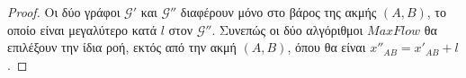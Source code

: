 \begin{proof}
  Οι δύο γράφοι $\mathcal{G}'$ και $\mathcal{G}''$ διαφέρουν μόνο στο βάρος της ακμής $\left(A, B\right)$, το οποίο είναι
  μεγαλύτερο κατά $l$ στον $\mathcal{G}''$. Συνεπώς οι δύο αλγόριθμοι $MaxFlow$ θα επιλέξουν την ίδια ροή, εκτός από την ακμή
  $\left(A, B\right)$, όπου θα είναι $x''_{AB} = x'_{AB} + l$.
\end{proof}
